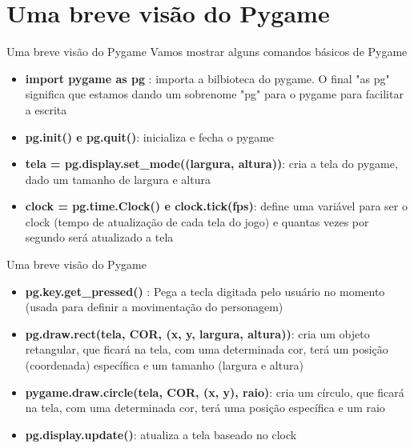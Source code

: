 \documentclass[fleqn,utf8,aspectratio=169,14pt]{beamer}
\begin{document}
	
	\section{Uma breve visão do Pygame}
	\begin{frame}{Uma breve visão do Pygame}
		Vamos mostrar alguns comandos básicos de Pygame
		\begin{itemize}
			\item \textbf{import pygame as pg} : importa a bilbioteca do pygame. O final "as pg" significa que estamos dando um sobrenome "pg" para o pygame para facilitar a escrita
			\item \textbf{pg.init() e pg.quit()}: inicializa e fecha o pygame
			\item \textbf{tela = pg.display.set\_mode((largura, altura))}: cria a tela do pygame, dado um tamanho de largura e altura
			\item \textbf{clock = pg.time.Clock() e clock.tick(fps)}: define uma variável para ser o clock (tempo de atualização de cada tela do jogo) e quantas vezes por segundo será atualizado a tela
		\end{itemize}
	
		
	\end{frame}
	\begin{frame}{Uma breve visão do Pygame}
		\begin{itemize}
			\item \textbf{pg.key.get\_pressed()} : Pega a tecla digitada pelo usuário no momento (usada para definir a movimentação do personagem)
			\item \textbf{pg.draw.rect(tela, COR, (x, y, largura, altura))}: cria um objeto retangular, que ficará na tela, com uma determinada cor, terá um posição (coordenada) específica e um tamanho (largura e altura)
			\item \textbf{pygame.draw.circle(tela, COR, (x, y), raio)}: cria um círculo, que ficará na tela, com uma determinada cor, terá uma posição específica e um raio
			\item \textbf{pg.display.update()}: atualiza a tela baseado no clock
		\end{itemize}
	\end{frame}
	
\end{document}
